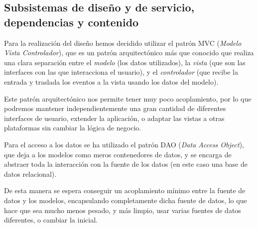 \subsection{Subsistemas de diseño y de servicio, dependencias y contenido}

Para la realización del diseño hemos decidido utilizar el patrón MVC (\textit{Modelo
Vista Controlador}), que es un patrón arquitectónico más que conocido que realiza
una clara separación entre el \textit{modelo} (los datos utilizados), la
\textit{vista} (que son las interfaces con las que interacciona el usuario), y
el \textit{controlador} (que recibe la entrada y traslada los eventos a la vista
usando los datos del modelo).

Este patrón arquitectónico nos permite tener muy poco acoplamiento, por lo que
podremos mantener independientemente una gran cantidad de diferentes interfaces
de usuario, extender la aplicación, o adaptar las vistas a otras plataformas sin
cambiar la lógica de negocio.

Para el acceso a los datos se ha utilizado el patrón DAO (\textit{Data Access
Object}), que deja a los modelos como meros contenedores de datos, y se encarga
de abstraer toda la interacción con la fuente de los datos (en este caso una
base de datos relacional).

De esta manera se espera conseguir un acoplamiento mínimo entre la fuente de
datos y los modelos, encapsulando completamente dicha fuente de datos, lo que
hace que sea mucho menos pesado, y más limpio, usar varias fuentes de datos
diferentes, o cambiar la inicial.


